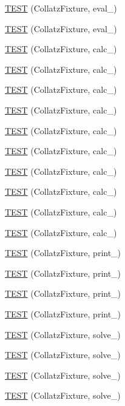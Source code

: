 \begin{DoxyCompactItemize}
\hyperlink{bmk447-TestCollatz_8c_09_09_a4a99476c845b27c020c894ff56c5331e}{T\-E\-S\-T} (Collatz\-Fixture, eval\-\_)
\item 
\hyperlink{bmk447-TestCollatz_8c_09_09_a9f543cfd5909f2cde83c41163f51fd19}{T\-E\-S\-T} (Collatz\-Fixture, eval\-\_)
\item 
\hyperlink{bmk447-TestCollatz_8c_09_09_adae6c5f13da05a89defd5d9fcbeed946}{T\-E\-S\-T} (Collatz\-Fixture, calc\-\_)
\item 
\hyperlink{bmk447-TestCollatz_8c_09_09_ad658667ed2888001269e9ca5cf857e1e}{T\-E\-S\-T} (Collatz\-Fixture, calc\-\_)
\item 
\hyperlink{bmk447-TestCollatz_8c_09_09_a30c66323dc99d8f1576cba4417949584}{T\-E\-S\-T} (Collatz\-Fixture, calc\-\_)
\item 
\hyperlink{bmk447-TestCollatz_8c_09_09_a004610af3ef14ddf1d675d6e60324ef9}{T\-E\-S\-T} (Collatz\-Fixture, calc\-\_)
\item 
\hyperlink{bmk447-TestCollatz_8c_09_09_aa75dc6a5c193c3ce46ad0664fc78532c}{T\-E\-S\-T} (Collatz\-Fixture, calc\-\_)
\item 
\hyperlink{bmk447-TestCollatz_8c_09_09_a93645a45052dd4e0cee9944fb13aae75}{T\-E\-S\-T} (Collatz\-Fixture, calc\-\_)
\item 
\hyperlink{bmk447-TestCollatz_8c_09_09_af241176a966815dfc9ce297cbc34283e}{T\-E\-S\-T} (Collatz\-Fixture, calc\-\_)
\item 
\hyperlink{bmk447-TestCollatz_8c_09_09_a95a2f110180b0df47e69d63c0a380a9e}{T\-E\-S\-T} (Collatz\-Fixture, calc\-\_)
\item 
\hyperlink{bmk447-TestCollatz_8c_09_09_a8126631b320ff31950667901a7057339}{T\-E\-S\-T} (Collatz\-Fixture, calc\-\_)
\item 
\hyperlink{bmk447-TestCollatz_8c_09_09_a6d489cc331215d5a6ea0882afc975351}{T\-E\-S\-T} (Collatz\-Fixture, calc\-\_)
\item 
\hyperlink{bmk447-TestCollatz_8c_09_09_a4bb3bce9465d20c35ec420e187f958c8}{T\-E\-S\-T} (Collatz\-Fixture, print\-\_)
\item 
\hyperlink{bmk447-TestCollatz_8c_09_09_a710b14401102f6b4647268dd499a6c63}{T\-E\-S\-T} (Collatz\-Fixture, print\-\_)
\item 
\hyperlink{bmk447-TestCollatz_8c_09_09_a3395d41febaedb3e4da972563e0cd383}{T\-E\-S\-T} (Collatz\-Fixture, print\-\_)
\item 
\hyperlink{bmk447-TestCollatz_8c_09_09_ab955fb99f29049a09141ef516e672f4f}{T\-E\-S\-T} (Collatz\-Fixture, print\-\_)
\item 
\hyperlink{bmk447-TestCollatz_8c_09_09_a3a16aafdd5586fe2f7442e7530e2ab6f}{T\-E\-S\-T} (Collatz\-Fixture, solve\-\_)
\item 
\hyperlink{bmk447-TestCollatz_8c_09_09_a231d54f2c8c30622abc04e3e0fddb29f}{T\-E\-S\-T} (Collatz\-Fixture, solve\-\_)
\item 
\hyperlink{bmk447-TestCollatz_8c_09_09_a5a6c3fb3d6ec07ebde790a169240adbe}{T\-E\-S\-T} (Collatz\-Fixture, solve\-\_)
\item 
\hyperlink{bmk447-TestCollatz_8c_09_09_a208c5ad95cbd79851e4815046c3718f6}{T\-E\-S\-T} (Collatz\-Fixture, solve\-\_)
\end{DoxyCompactItemize}


